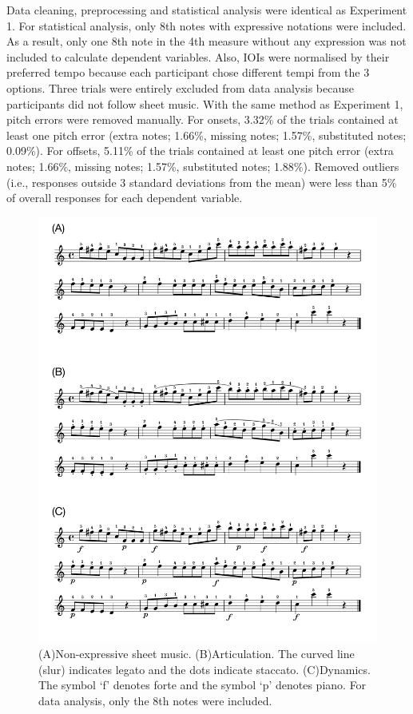 \documentclass[
  english,
  man,floatsintext]{apa6}
\begin{document}
Data cleaning, preprocessing and statistical analysis were identical as Experiment 1. For statistical analysis, only 8th notes with expressive notations were included. As a result, only one 8th note in the 4th measure without any expression was not included to calculate dependent variables. Also, IOIs were normalised by their preferred tempo because each participant chose different tempi from the 3 options. Three trials were entirely excluded from data analysis because participants did not follow sheet music. With the same method as Experiment 1, pitch errors were removed manually. For onsets, 3.32\% of the trials contained at least one pitch error (extra notes; 1.66\%, missing notes; 1.57\%, substituted notes; 0.09\%). For offsets, 5.11\% of the trials contained at least one pitch error (extra notes; 1.66\%, missing notes; 1.57\%, substituted notes; 1.88\%). Removed outliers (i.e., responses outside 3 standard deviations from the mean) were less than 5\% of overall responses for each dependent variable.

\begin{figure}
\includegraphics[width=1\linewidth]{manuscript_files/figure-latex/stim-2-1} \caption{\label{fig:stimuli-2}(A)Non-expressive sheet music. (B)Articulation. The curved line (slur) indicates legato and the dots indicate staccato. (C)Dynamics. The symbol `f' denotes forte and the symbol `p' denotes piano. For data analysis, only the 8th notes were included.}\label{fig:stim-2}
\end{figure}
\end{document}
